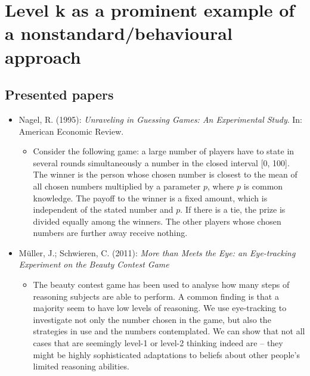 
\chapter{Level k as a prominent example of a nonstandard/behavioural approach}


\section{Presented papers}

\begin{itemize}
	\item Nagel, R. (1995): \textit{Unraveling in Guessing Games: An Experimental Study}. In: American Economic Review.
		\begin{itemize}
			\item Consider the following game: a large number of players have to state in several rounds simultaneously a number in the closed interval [0, 100]. The winner is the person whose chosen number is closest to the mean of all chosen numbers multiplied by a parameter $p$, where $p$ is common knowledge. The payoff to the winner is a fixed amount, which is independent of the stated number and $p$. If there is a tie, the prize is divided equally among the winners. The other players whose chosen numbers are further away receive nothing.
		\end{itemize}
	\item Müller, J.; Schwieren, C. (2011): \textit{More than Meets the Eye: an Eye-tracking Experiment on the Beauty Contest Game}
		\begin{itemize}
			\item The beauty contest game has been used to analyse how many steps of reasoning subjects are able to perform. A common finding is that a majority seem to have low levels of reasoning. We use eye-tracking to investigate not only the number chosen in the game, but also the strategies in use and the numbers contemplated. We can show that not all cases that are seemingly level-1 or level-2 thinking indeed are – they might be highly sophisticated adaptations to beliefs about other people’s limited reasoning abilities.
		\end{itemize}
\end{itemize}		

\newpage